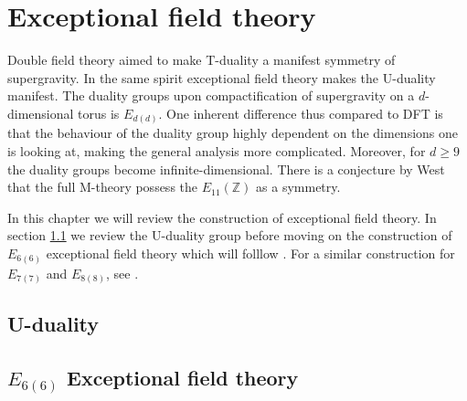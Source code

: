 \chapter{Exceptional field theory}

Double field theory aimed to make T-duality a manifest symmetry of supergravity. In the same spirit exceptional field theory makes the U-duality manifest. The duality groups upon compactification of supergravity on a $d$-dimensional torus is $E_{d(d)}$. One inherent difference thus compared to DFT is that the behaviour of the duality group highly dependent on the dimensions one is looking at, making the general analysis more complicated. Moreover, for $d\geq 9$ the duality groups become infinite-dimensional. There is a conjecture by West \cite{West2011} that the full M-theory possess the $E_{11}(\mathbb{Z})$ as a symmetry. 

In this chapter we will review the construction of exceptional field theory. In section \ref{sec:Uduality} we review the U-duality group before moving on the construction of $E_{6(6)}$ exceptional field theory which will folllow \cite{E62014}. For a similar construction for $E_{7(7)}$ and $E_{8(8)}$, see \cite{E72014,E82014}. 



\section{U-duality}\label{sec:Uduality}



\section{$E_{6(6)}$ Exceptional field theory}
